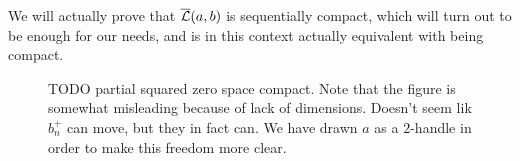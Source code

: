 We will actually prove that $\overline{\mathcal L}(a, b)$ is sequentially compact, which will turn out to be enough for our needs, and is in this context actually equivalent with being compact.

\begin{figure}[H]
    \centering
    \caption{TODO partial squared zero space compact.
        Note that the figure is somewhat misleading because of lack of dimensions.
        Doesn't seem lik $b_n^{+}$ can move, but they in fact can.
        We have drawn $a$ as a $2$-handle in order to make this freedom more clear.
    }
    \label{fig:partial-squared-zero-space-compact}
\end{figure}



